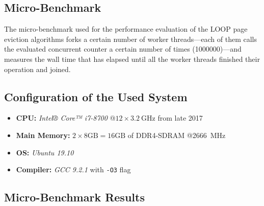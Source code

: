 \subsection[Micro-Benchmark]{Micro-Benchmark}

    The micro-benchmark used for the performance evaluation of the LOOP page eviction algorithms forks a certain number of worker threads---each of them calls the evaluated concurrent counter a certain number of times (\num{1000000})---and measures the wall time that has elapsed until all the worker threads finished their operation and joined.

\subsection[System Configuration]{Configuration of the Used System}

\begin{@empty}
    \begin{itemize}
        \itemsep0em
		\item	\textbf{CPU:} \emph{Intel® Core™ i7-8700} @$12 \times \SI{3.2}{\giga\hertz}$ from late 2017
        \item	\textbf{Main Memory:} $2 \times 8\text{GB} = 16\text{GB}$ of DDR4-SDRAM @\SI{2666}{\mega\hertz}
        \item	\textbf{OS:} \emph{Ubuntu 19.10}
        \item	\textbf{Compiler: } \emph{GCC 9.2.1} with \texttt{-O3} flag
    \end{itemize}
\end{@empty}

\subsection[Micro-Benchmark Results]{Micro-Benchmark Results} \label{subsec:loop-results}

